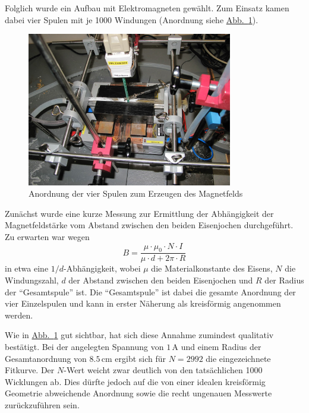 \documentclass[11pt]{scrartcl}
\newcommand{\unit}[1]{\ensuremath{\,\mathrm{#1}}} %
\newcommand{\abb}[1]{\hyperref[#1]{Abb.~\ref{#1}}}
\begin{document}
Folglich wurde ein Aufbau mit Elektromagneten gewählt. Zum Einsatz kamen dabei vier Spulen mit je 1000 Windungen (Anordnung siehe \abb{bfeld-vor2}).

\begin{figure}[ht]
\begin{center}
\includegraphics[width=0.8\textwidth]{images/bfeld-vor2.jpg}
\end{center}
\vspace{-1.5\baselineskip}
\caption{Anordnung der vier Spulen zum Erzeugen des Magnetfelds}
\label{bfeld-vor2}
\end{figure}

Zunächst wurde eine kurze Messung zur Ermittlung der Abhängigkeit der Magnetfeldstärke vom Abstand zwischen den beiden Eisenjochen
durchgeführt. Zu erwarten war wegen 
\begin{equation}
B = \frac{\mu \cdot \mu_{0} \cdot N \cdot I}{\mu \cdot d + 2 \pi \cdot R}
\end{equation}
in etwa eine $1/d$-Abhängigkeit, wobei $\mu$ die Materialkonstante des Eisens, $N$ die Windungszahl, $d$ der Abstand zwischen den beiden Eisenjochen und $R$ der Radius der "`Gesamtspule"' ist. Die "`Gesamtspule"' ist dabei die gesamte Anordnung der vier Einzelspulen und kann in erster Näherung als kreisförmig angenommen werden.

Wie in \abb{bfeld-vor2} gut sichtbar, hat sich diese Annahme zumindest qualitativ bestätigt. Bei der angelegten Spannung von $1 \unit{A}$ und einem Radius der Gesamtanordnung von $8.5 \unit{cm}$ ergibt sich für $N=2992$ die eingezeichnete Fitkurve. Der $N$-Wert weicht zwar deutlich von den tatsächlichen 1000 Wicklungen ab. Dies dürfte jedoch auf die von einer idealen kreisförmig Geometrie abweichende Anordnung sowie die recht ungenauen Messwerte zurückzuführen sein.
\end{document}
